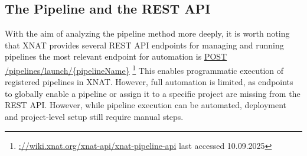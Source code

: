 \subsection{The Pipeline and the REST API}
With the aim of analyzing the pipeline method more deeply, it is worth noting that XNAT provides several REST API endpoints for managing and running pipelines the most relevant endpoint for automation is \url{POST /pipelines/launch/{pipelineName}} \footnote{\url{://wiki.xnat.org/xnat-api/xnat-pipeline-api} last accessed 10.09.2025}
This enables programmatic execution of registered pipelines in XNAT. However, full automation is limited, as endpoints to globally enable a pipeline or assign it to a specific project are missing from the REST API. However, while pipeline execution can be automated, deployment and project-level setup still require manual steps.



